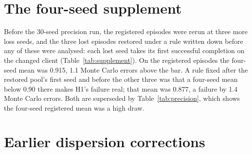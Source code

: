 \documentclass[11pt]{article}
\begin{document}
\begin{table}[h]
\centering

\caption{Whole-session outages. Post hoc.}
\label{tab:outages}
\end{table}

\begin{table}[h]
\centering

\caption{Phase structure, gateway-and-trace outages, and shared session quality.
Post hoc.}
\label{tab:sessionphase}
\end{table}

\begin{table}[h]
\centering

\label{tab:burstseeds}
\caption{One burst cell on every set of loss seeds that ran it.}
\end{table}

\clearpage

\section{The four-seed supplement}
\label{app:supplement}

Before the 30-seed precision run, the registered episodes were rerun at three
more loss seeds, and the three lost episodes restored under a rule written down
before any of these were analysed: each lost seed takes its first successful
completion on the changed client (Table~\ref{tab:supplement}). On the registered
episodes the four-seed mean was 0.915, 1.1 Monte Carlo errors above the bar. A
rule fixed after the restored pool's first seed and before the other three was
that a four-seed mean below 0.90 there makes H1's failure real; that mean was
0.877, a failure by 1.4 Monte Carlo errors. Both are superseded by
Table~\ref{tab:precision}, which shows the four-seed registered mean was a high
draw.

\begin{table}[h]
\centering

\caption{The coverage hypothesis across four loss seeds, with and without the
lost episodes. Post hoc; superseded by Table~\ref{tab:precision}.}
\label{tab:supplement}
\end{table}

\section{Earlier dispersion corrections}
\label{app:quasi}
\end{document}
